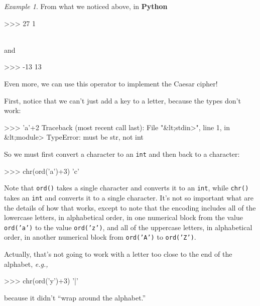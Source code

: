 \documentclass[12pt,letterpaper]{amsbook}
\theoremstyle{definition}
\theoremstyle{remark}
\newtheorem{example}[theorem]{Example}
\numberwithin{figure}{section}
\numberwithin{exercise}{chapter}
\numberwithin{section}{chapter}
\numberwithin{equation}{section}
\numberwithin{table}{subsection}
\newcommand{\code}[1]{\colorbox{lg}{\texttt{#1}}}
\newcommand{\Python}{{\textbf{\ix{Python}}}}
\newcommand{\ix}[1]{{#1}\index{#1}}
\begin{document}
\begin{example}\label{eg:basicmodsinPy}
  From what we noticed above, in \Python
  
  \noindent\begin{codedisp}
    >>> 27%
    1
  \end{codedisp}
  \\
  and\\[2mm]
  \noindent\begin{codedisp}
    >>> -13%
    13
  \end{codedisp}
  
  \noindent Even more, we can use this operator to implement the Caesar cipher!

  First, notice that we can't just add a key to a letter, because the types
  don't work:

  \noindent\begin{codedisp}
    >>> 'a'+2
    Traceback (most recent call last):
      File "&lt;stdin>", line 1, in &lt;module>
    TypeError: must be str, not int
  \end{codedisp}

  So we must first convert a character to an \code{int} and then back to
  a character:\\
  \noindent\begin{codedisp}
    >>> chr(ord('a')+3)
    'c'
  \end{codedisp}
  
  Note that \code{ord()} takes a single character and converts it to an
  \code{int}, while \code{chr()} takes an \code{int} and
  converts it to a single character.  It's not so important what
  are the details of how that works, except to note that the encoding includes
  all of the lowercase letters, in alphabetical order, in one numerical block
  from the value \code{ord('a')} to the value \code{ord('z')}, and
  all of the uppercase letters, in alphabetical order, in another numerical
  block from \code{ord('A')} to \code{ord('Z')}.

  Actually, that's not going to work with a letter too close to the end of
  the alphabet, \textit{e.g.,}\\
  \noindent\begin{codedisp}
    >>> chr(ord('y')+3)
    '|'
  \end{codedisp}
  
  \noindent because it didn't ``wrap around the alphabet.''


\end{example}
\end{document}
